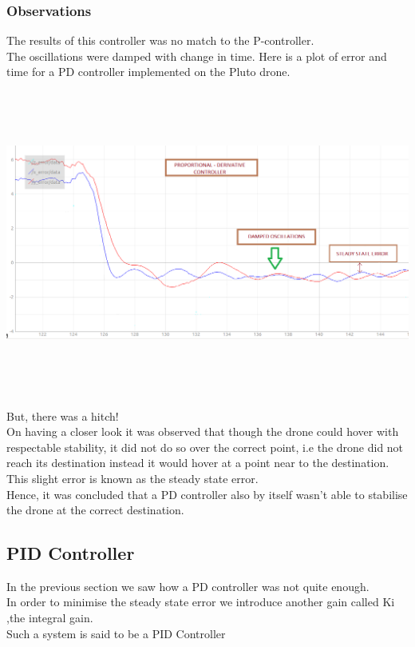 \documentclass[a4paper,12pt,oneside]{book}
\begin{document}
\subsubsection{\textbf{Observations}}
The results of this controller was no match to the P-controller.\\
The oscillations were damped with change in time.
Here is a plot of error and time for a PD controller implemented on the Pluto drone.
\begin{flushleft}
\includegraphics[width = 15cm , height= 10cm]{pd-controller.png}
\end{flushleft}
But, there was a hitch! \\
On having a closer look it was observed that though the drone could hover with respectable stability, it did not do so over the correct point, i.e the drone did not reach its destination instead it would hover at a point near to the destination.\\
This slight error is known as the steady state error.\\
Hence, it was concluded that a PD controller also by itself wasn't able to stabilise the drone at the correct destination.

\subsection{PID Controller}
In the previous section we saw how a PD controller was not quite enough.\\
In order to minimise the steady state error we introduce another gain called Ki ,the integral gain.\\
Such a system is said to be a PID Controller
\end{document}
